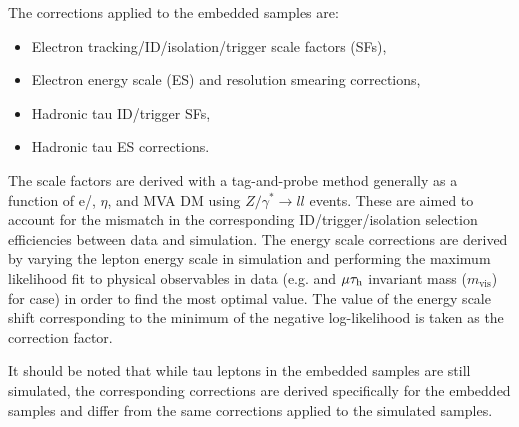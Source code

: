 The corrections applied to the embedded samples are:
\begin{itemize}
    \item Electron tracking/ID/isolation/trigger scale factors (SFs),
    \item Electron energy scale (ES) and resolution smearing corrections,
    \item Hadronic tau ID/trigger SFs,
    \item Hadronic tau ES corrections.
\end{itemize}

The scale factors are derived with a tag-and-probe method \cite{CMS:2010svw} generally as a function of e/\tauh \pt, $\eta$, and MVA DM using $Z/\gamma^*\to ll$ events. These are aimed to account for the mismatch in the corresponding ID/trigger/isolation selection efficiencies between data and simulation. The energy scale corrections are derived by varying the lepton energy scale in simulation and performing the maximum likelihood fit to physical observables in data (e.g. \tauh and $\mu\tau_\mathrm{h}$ invariant mass ($m_\text{vis}$) for \tauh case) in order to find the most optimal value. The value of the energy scale shift corresponding to the minimum of the negative log-likelihood is taken as the correction factor.

It should be noted that while tau leptons in the embedded samples are still simulated, the corresponding corrections are derived specifically for the embedded samples and differ from the same corrections applied to the simulated samples.

